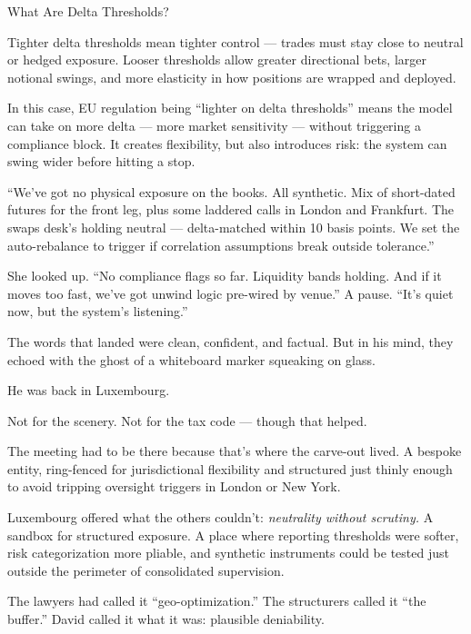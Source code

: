 \begin{TechnicalSidebar}{What Are Delta Thresholds?}
  \medskip

  Tighter delta thresholds mean tighter control — trades must stay close to neutral or hedged exposure.  
  Looser thresholds allow greater directional bets, larger notional swings, and more elasticity in how positions 
  are wrapped and deployed.

  \medskip

  In this case, EU regulation being “lighter on delta thresholds” means the model can take on more delta — more 
  market sensitivity —  
  without triggering a compliance block. It creates flexibility, but also introduces risk: the system can swing 
  wider before hitting a stop.

\end{TechnicalSidebar}

\medskip

``We’ve got no physical exposure on the books. All synthetic. Mix of short-dated futures for the front 
leg, plus some laddered calls in London and Frankfurt. The swaps desk’s holding neutral — delta-matched 
within 10 basis points. We set the auto-rebalance to trigger if correlation assumptions break outside 
tolerance.''

She looked up. ``No compliance flags so far. Liquidity bands holding. And if it moves too fast, we’ve 
got unwind logic pre-wired by venue.''
A pause. ``It’s quiet now, but the system’s listening.''

The words that landed were clean, confident, and factual.
But in his mind, they echoed with the ghost of a whiteboard marker squeaking on glass.

He was back in Luxembourg.

Not for the scenery. Not for the tax code — though that helped.

The meeting had to be there because that’s where the carve-out lived.
A bespoke entity, ring-fenced for jurisdictional flexibility and structured just thinly enough to avoid tripping oversight triggers in London or New York.

Luxembourg offered what the others couldn't:
\textit{neutrality without scrutiny.}
A sandbox for structured exposure.
A place where reporting thresholds were softer, risk categorization more pliable, and synthetic instruments could be tested just outside the perimeter of consolidated supervision.

The lawyers had called it “geo-optimization.”
The structurers called it “the buffer.”
David called it what it was: plausible deniability.

